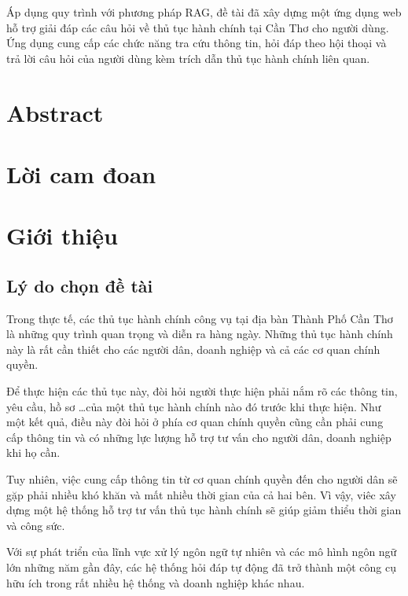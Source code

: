 \documentclass[a4paper, 12pt, openany]{book}
\renewcommand{\headrulewidth}{0pt}
\renewcommand{\headrulewidth}{0pt}
\begin{document}
Áp dụng quy trình với phương pháp RAG, đề tài đã xây dựng một ứng dụng web hỗ trợ giải đáp các câu hỏi về thủ tục hành chính tại Cần Thơ cho người dùng.
Ứng dụng cung cấp các chức năng tra cứu thông tin, hỏi đáp theo hội thoại và trả lời câu hỏi của người dùng kèm trích dẫn thủ tục hành chính liên quan.

\chapter*{Abstract}

\chapter*{Lời cam đoan}


\tableofcontents
\listoffigures
\listoftables


\printacronyms[name={Danh mục từ viết tắt}]

\renewcommand{\headrulewidth}{1pt} %

\chapter{Giới thiệu}

\section{Lý do chọn đề tài}

Trong thực tế, các thủ tục hành chính công vụ tại địa bàn Thành Phố Cần Thơ là những quy trình quan trọng và
diễn ra hàng ngày. Những thủ tục hành chính này là rất cần thiết cho các người dân, doanh nghiệp và cả các
cơ quan chính quyền.

Để thực hiện các thủ tục này, đòi hỏi người thực hiện phải nắm rõ các thông tin, yêu cầu, hồ sơ \dots của một thủ tục hành chính
nào đó trước khi thực hiện. Như một kết quả, điều này đòi hỏi ở phía cơ quan chính quyền cũng cần phải cung cấp thông tin
và có những lực lượng hỗ trợ tư vấn cho người dân, doanh nghiệp khi họ cần.

Tuy nhiên, việc cung cấp thông tin từ cơ quan chính quyền đến cho người dân sẽ gặp phải nhiều khó khăn và mất nhiều thời gian của cả hai bên.
Vì vậy, viêc xây dựng một hệ thống hỗ trợ tư vấn thủ tục hành chính sẽ giúp giảm thiểu thời gian và công sức.

Với sự phát triển của lĩnh vực xử lý ngôn ngữ tự nhiên và các mô hình ngôn ngữ lớn những năm gần đây, 
các hệ thống hỏi đáp tự động đã trở thành một công cụ hữu ích trong rất nhiều hệ thống và doanh nghiệp khác nhau.
\end{document}
